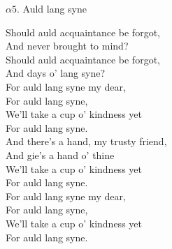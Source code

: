 \documentclass[a6paper,10pt]{article}
\newcommand{\songtitle}[2]{\Large{#1. #2}\\}
\newenvironment{lyrics}{}{} %
\begin{document}
\setlength{\oddsidemargin}{-0.37in}
\begin{center}
\songtitle{$\alpha5$}{Auld lang syne}
\end{center}
\begin{lyrics}
Should auld acquaintance be forgot, \\
And never brought to mind? \\
Should auld acquaintance be forgot, \\
And days o' lang syne? \\
For auld lang syne my dear, \\
For auld lang syne, \\
We'll take a cup o' kindness yet \\
For auld lang syne. \\
\newline
And there's a hand, my trusty friend, \\
And gie's a hand o' thine \\
We'll take a cup o' kindness yet \\
For auld lang syne. \\
For auld lang syne my dear, \\
For auld lang syne, \\
We'll take a cup o' kindness yet \\
For auld lang syne.
\end{lyrics}
\end{document}
